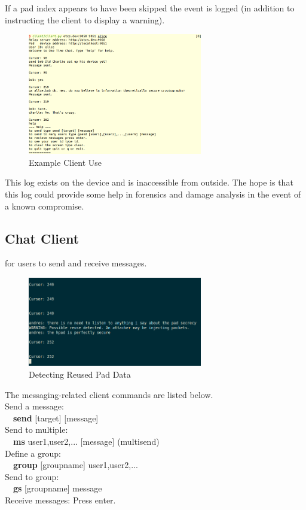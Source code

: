 \documentclass[twocolumn]{article}
\begin{document}
If a pad index appears to have been skipped the event is logged
(in addition to instructing the client
to display a warning).

\begin{figure}[htp]
\centering
\includegraphics[width=3in]{sample}
\caption{Example Client Use}
\end{figure}

This log exists on the device and is inaccessible from outside.
The hope is that this log could provide some help in forensics
and damage analysis in the event of a known compromise.


\subsection{Chat Client}
 for users to send and receive messages.


\begin{figure}[htp]
\centering
\includegraphics[width=3in]{reuse}
\caption{Detecting Reused Pad Data}
\end{figure}

The messaging-related client commands are listed below.\\
Send a message:\\
\-\ \-\ \textbf{send} [target] [message]\\
Send to multiple:\\
\-\ \-\ \textbf{ms} user1,user2,... [message] (multisend)\\
Define a group:\\
\-\ \-\ \textbf{group} [groupname] user1,user2,...\\
Send to group:\\
\-\ \-\ \textbf{gs} [groupname] message\\
Receive messages:
Press enter.
\end{document}
